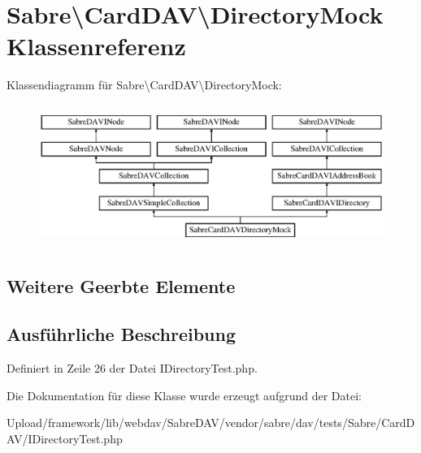 \hypertarget{class_sabre_1_1_card_d_a_v_1_1_directory_mock}{}\section{Sabre\textbackslash{}Card\+D\+AV\textbackslash{}Directory\+Mock Klassenreferenz}
\label{class_sabre_1_1_card_d_a_v_1_1_directory_mock}
Klassendiagramm für Sabre\textbackslash{}Card\+D\+AV\textbackslash{}Directory\+Mock\+:\begin{figure}[H]
\begin{center}
\leavevmode
\includegraphics[height=4.643449cm]{class_sabre_1_1_card_d_a_v_1_1_directory_mock}
\end{center}
\end{figure}
\subsection*{Weitere Geerbte Elemente}


\subsection{Ausführliche Beschreibung}


Definiert in Zeile 26 der Datei I\+Directory\+Test.\+php.



Die Dokumentation für diese Klasse wurde erzeugt aufgrund der Datei\+:\begin{DoxyCompactItemize}
\item 
Upload/framework/lib/webdav/\+Sabre\+D\+A\+V/vendor/sabre/dav/tests/\+Sabre/\+Card\+D\+A\+V/I\+Directory\+Test.\+php\end{DoxyCompactItemize}
